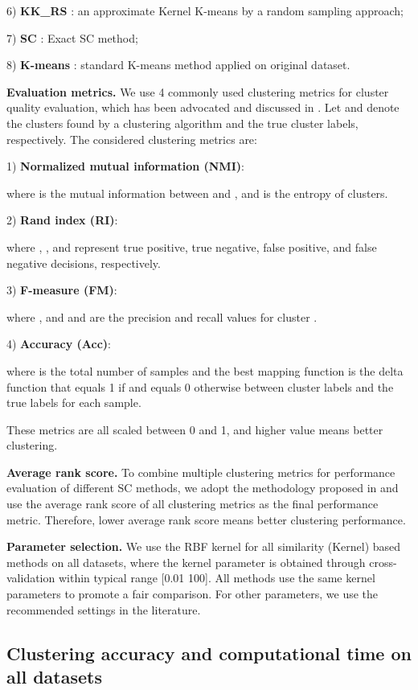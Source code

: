 \documentclass[sigconf]{acmart}
\newcommand{\1}{\boldsymbol{1}}
\newcommand{\0}{\boldsymbol{0}}
\begin{document}
6) \textbf{KK\_RS} \cite{chitta2011approximate}: an approximate Kernel K-means by a random sampling approach; 

7) \textbf{SC} \cite{ng2002spectral}: Exact SC method; 

8) \textbf{K-means} \cite{hartigan1979algorithm}: standard K-means method applied on original dataset. 

\textbf{Evaluation metrics.} We use 4 commonly used clustering metrics for cluster quality evaluation, which has been advocated and discussed in \cite{zaki2014data}.
Let   and  denote the   clusters found by a clustering algorithm and the true cluster labels, respectively. The considered clustering metrics are: 

1) \textbf{Normalized mutual information (NMI)}: 
 
where  is the mutual information between  and , and  is the entropy of clusters.

2) \textbf{Rand index (RI)}: 
 
where , ,  and  represent true positive, true negative, false positive, and false negative decisions, respectively. 

3) \textbf{F-measure (FM)}: 
 
where , and  and  are the precision and recall values for cluster .

4) \textbf{Accuracy (Acc)}: 

where  is the total number of samples and the best mapping function  is the delta function that equals 1 if  and equals 0 otherwise between cluster labels  and the true labels  for each sample. 

These metrics are all scaled between 0 and 1, and higher value means better clustering.

\textbf{Average rank score.} To combine multiple clustering metrics for performance evaluation of different SC methods, we adopt the methodology proposed in \cite{yang2015defining} and use the average rank score of all clustering metrics as the final performance metric. Therefore, lower average rank score means better clustering performance.

\textbf{Parameter selection.} We use the RBF kernel for all similarity (Kernel) based methods on all datasets, where the kernel parameter  is obtained through cross-validation within typical range [0.01 100]. All methods use the same kernel parameters to promote a fair comparison. For other parameters, we use the recommended settings in the literature. 


\subsection{Clustering accuracy and computational time on all datasets}
\end{document}
